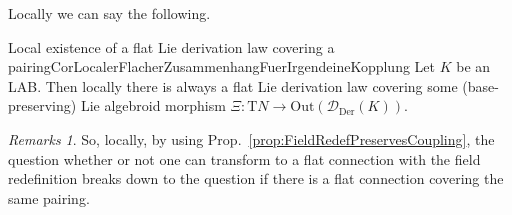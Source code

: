 \documentclass[preprint]{elsarticle}
\def\ba#1\ea{\begin{align}#1\end{align}}
\theoremstyle{plain}
\newtheorem{proposition}[theorem]{Proposition}
\theoremstyle{remark}
\newtheorem{remark}[theorem]{Remarks}
\theoremstyle{definition}
\begin{document}

%

Locally we can say the following.

\begin{corollaries}{Local existence of a flat Lie derivation law covering a pairing}{CorLocalerFlacherZusammenhangFuerIrgendeineKopplung}
Let $K$ be an LAB. Then locally there is always a flat Lie derivation law covering some (base-preserving) Lie algebroid morphism $\Xi: \mathrm{T}N \to \mathrm{Out}(\mathcal{D}_{\mathrm{Der}}(K))$.
\end{corollaries}

\begin{remark}
\leavevmode\newline
So, locally, by using Prop.~\ref{prop:FieldRedefPreservesCoupling}, the question whether or not one can transform to a flat connection with the field redefinition breaks down to the question if there is a flat connection covering the same pairing.
\end{remark}
\end{document}
